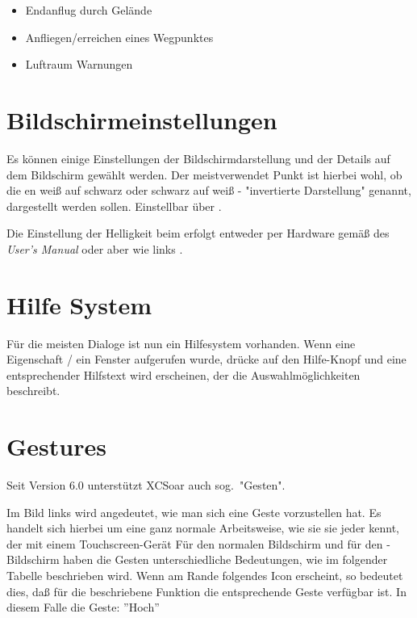 \begin{itemize}
\item Endanflug durch Gelände
\item Anfliegen/erreichen eines Wegpunktes
\item Luftraum Warnungen
\end{itemize}

\section{Bildschirmeinstellungen}

Es können einige Einstellungen der Bildschirmdarstellung und der Details auf dem Bildschirm gewählt werden.  Der meistverwendet Punkt  ist hierbei wohl, ob die {\InfoBox}en weiß auf schwarz oder schwarz auf weiß - "invertierte Darstellung" genannt, dargestellt werden sollen.  Einstellbar über . 

Die Einstellung der Helligkeit beim \al erfolgt entweder per Hardware gemäß des {\em \al User's Manual} oder aber wie links .  




\section{Hilfe System}
  Für die meisten Dialoge ist nun ein Hilfesystem vorhanden.
  Wenn eine Eigenschaft / ein Fenster  aufgerufen wurde, drücke auf den Hilfe-Knopf und eine entsprechender Hilfstext wird erscheinen, der die Auswahlmöglichkeiten  beschreibt. 

\section{Gestures}\label{sec:gestures}
Seit Version 6.0 unterstützt \textsf{XCSoar} auch sog.\  "Gesten".

Im Bild links wird angedeutet, wie man sich eine Geste vorzustellen hat. 
Es handelt sich hierbei um eine ganz normale Arbeitsweise, wie sie sie jeder kennt, der mit einem Touchscreen-Gerät
Für den normalen Bildschirm und für den  \fl-Bildschirm haben die Gesten unterschiedliche Bedeutungen, wie im  folgender Tabelle beschrieben wird. 
\newpage
 Wenn am Rande folgendes Icon  erscheint, so bedeutet dies, daß für die beschriebene Funktion  die entsprechende Geste verfügbar ist. In diesem Falle  die Geste: ''Hoch''

